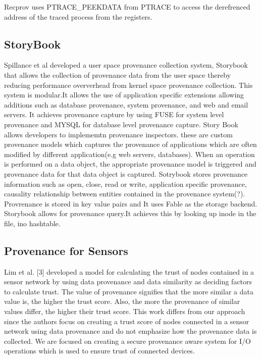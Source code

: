 Recprov uses PTRACE\_PEEKDATA from PTRACE to access the derefrenced address of the traced process from the registers.

\subsection{StoryBook}
Spillance et al developed a user space provenance collection system, Storybook \cite{Rabinovich1995}  that allows the collection of provenance data from the user space thereby reducing performance oververhead from kernel space provenance collection. This system is modular.It allows the use of application specific extensions allowing additions such as database provenance, system provenance, and web and email servers. It achieves provenance capture by using FUSE for system level provenance and MYSQL for database level provenance capture. Story Book allows developers to implememtn provenance inspectors. these are custom provenance models which captures the provenance of applications which are often modified by different application(e.g web servers, databases). When an operation is performed on a data object, the appropriate provenance model is triggered and provenance data for that data object is captured. Sotrybook stores provenance information such as open, close, read or write, application specific provenance, causality relationship between entities contained in the provenance system(?). Provrenance is stored in key value pairs and It uses Fable as the storage backend. Storybook allows for provenance query.It achieves this by looking up inode in the file, ino hashtable.

\subsection{Provenance for Sensors}
Lim et al. [3] developed a
model for calculating the trust of nodes contained in a sensor network by using data
provenance and data similarity as deciding factors to calculate trust. The value of
provenance signifies that the more similar a data value is, the higher the trust score.
Also, the more the provenance of similar values differ, the higher their trust score.
This work differs from our approach since the authors focus on creating a trust score
of nodes connected in a sensor network using data provenance and do not emphasize
how the provenance data is collected. We are focused on creating a secure
provenance aware system for I/O operations which is used to ensure trust of
connected devices.




